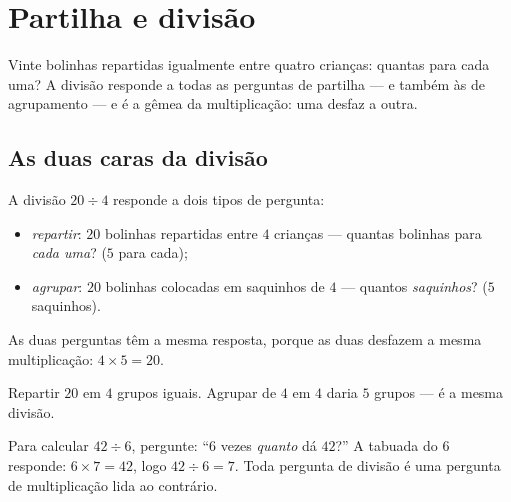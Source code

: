\chapter{Partilha e divisão}\label{ch:g3:division}

Vinte bolinhas repartidas igualmente entre quatro crianças: quantas
para cada uma? A divisão responde a todas as perguntas de partilha
--- e também às de agrupamento --- e é a gêmea da multiplicação: uma
desfaz a outra.

\section{As duas caras da divisão}

\begin{definition}[Divisão]\label{def:g3:division:def}
A divisão $20 \div 4$ responde a dois tipos de pergunta:
\begin{itemize}
  \item \emph{repartir}: $20$ bolinhas repartidas entre $4$ crianças
        --- quantas bolinhas para \emph{cada uma}? ($5$ para cada);
  \item \emph{agrupar}: $20$ bolinhas colocadas em saquinhos de $4$
        --- quantos \emph{saquinhos}? ($5$ saquinhos).
\end{itemize}
As duas perguntas têm a mesma resposta, porque as duas desfazem a
mesma multiplicação: $4 \times 5 = 20$.
\end{definition}

\begin{omfigure}

{\small Repartir $20$ em $4$ grupos iguais. Agrupar de $4$ em $4$
daria $5$ grupos --- é a mesma divisão.}
\end{omfigure}

\begin{method}\label{met:g3:division:tables}
Para calcular $42 \div 6$, pergunte: ``$6$ vezes \emph{quanto} dá
$42$?'' A tabuada do $6$ responde: $6 \times 7 = 42$, logo
$42 \div 6 = 7$. Toda pergunta de divisão é uma pergunta de
multiplicação lida ao contrário.
\end{method}

